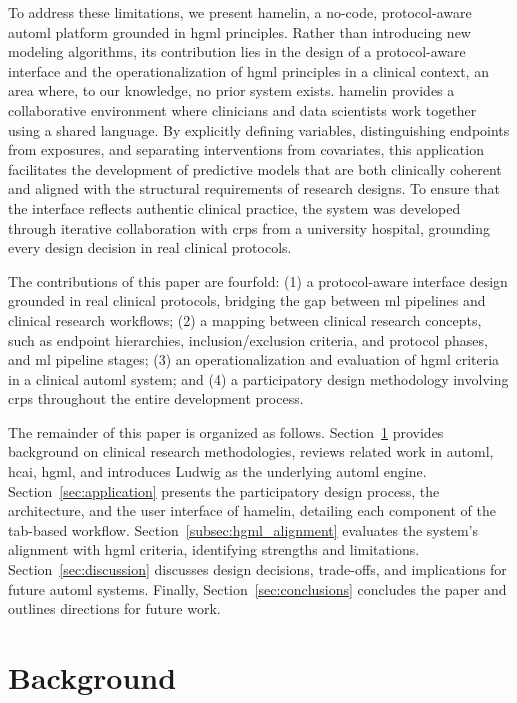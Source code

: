 \documentclass[conference,onecolumn]{IEEEtran}
\begin{document}
To address these limitations, we present \gls{hamelin}, a no-code, protocol-aware 
\gls{automl} platform grounded in \gls{hgml} principles. Rather than introducing new modeling algorithms, its contribution lies in the design of a protocol-aware interface and the operationalization of \gls{hgml} principles in a clinical context, an area where, to our knowledge, no prior system exists. \gls{hamelin} provides a collaborative environment where clinicians and data scientists work together using a shared language. By explicitly defining variables, distinguishing endpoints from exposures, and separating interventions from covariates, this application facilitates the development of predictive models that are both clinically coherent and aligned with the structural requirements of research designs. To ensure that the interface reflects authentic clinical practice, the system was developed through iterative collaboration with \glspl{crp} from a university hospital, grounding every design decision in real clinical protocols.

The contributions of this paper are fourfold: (1) a protocol-aware interface design grounded in real clinical protocols, bridging the gap between \gls{ml} pipelines and clinical research workflows; (2) a mapping between clinical research concepts, such as endpoint hierarchies, inclusion/exclusion criteria, and protocol phases, and \gls{ml} pipeline stages; (3) an operationalization and evaluation of \gls{hgml} 
criteria in a clinical \gls{automl} system; and (4) a participatory design methodology involving \glspl{crp} throughout the entire development process.

The remainder of this paper is organized as follows. Section~\ref{sec:background} 
provides background on clinical research methodologies, reviews related work in \gls{automl}, \gls{hcai}, \gls{hgml}, and introduces Ludwig as the underlying \gls{automl} engine. Section~\ref{sec:application} presents the participatory design process, the architecture, and the user interface of \gls{hamelin}, detailing each component of the tab-based workflow. Section~\ref{subsec:hgml_alignment} evaluates the system's alignment with \gls{hgml} criteria, identifying strengths and limitations. Section~\ref{sec:discussion} discusses design decisions, trade-offs, and implications for future \gls{automl} systems. Finally, Section~\ref{sec:conclusions} concludes the paper and outlines directions for future work.


\section{Background}
\label{sec:background}
\end{document}
